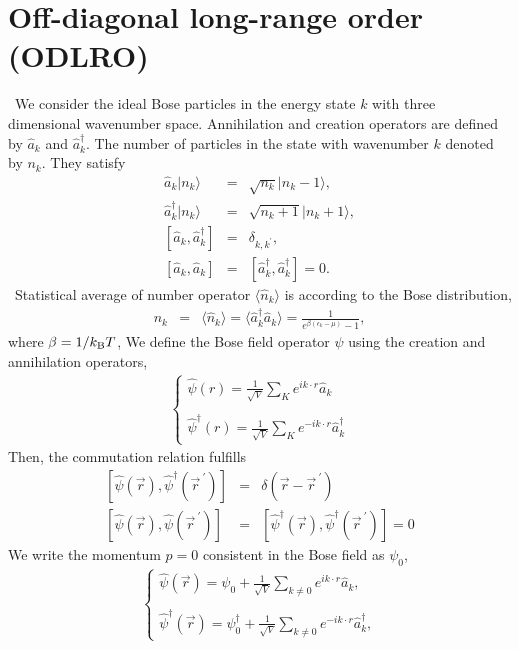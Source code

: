 \documentclass[12pt,a4paper]{report}
\newcommand{\kb} {k_{\rm B}}				            %
\begin{document}
\section{Off-diagonal long-range order (ODLRO)}
\ We consider the ideal Bose particles in the energy state $k$ with three dimensional wavenumber space.
Annihilation and creation operators are defined by $\hat{a}_{k}$ and $\hat{a}^\dagger_{k}$.
The number of particles in the state with wavenumber $k$ denoted by $n_k$. They satisfy
\begin{eqnarray}
\hat{a}_k | n_k \rangle & = & \sqrt{n_k}|n_k - 1 \rangle,
\\
\hat{a}^\dagger_k | n_k \rangle & = & \sqrt{n_k+1} | n_k + 1 \rangle,
\\
\left[ \hat{a}_k, \hat{a}^\dagger_k \right] & = & \delta_{k,k^\prime},
\\
\left[ \hat{a}_k, \hat{a}_k \right] & = & \left[ \hat{a}^\dagger_k, \hat{a}^\dagger_k \right] = 0.
\end{eqnarray}
\ Statistical average of number operator $\langle \hat{n}_k \rangle$ 
is according to the Bose distribution,
\begin{eqnarray}
n_k & = & \langle \hat{n}_k \rangle = \langle \hat{a}^\dagger_k \hat{a}_k \rangle = \frac{1}{e^{\beta(\epsilon_k - \mu)} - 1},
\end{eqnarray}
where $\beta = 1/\kb T$,
We define the Bose field operator $\psi$ using the creation and annihilation operators,
\begin{eqnarray}
\left \{
\begin{array}{l}
\hat{\psi} (r) = \frac{1}{\sqrt{V}} \sum_K e^{i k \cdot r} \hat{a}_k
\\
\\
\hat{\psi}^\dagger (r) = \frac{1}{\sqrt{V}} \sum_K e^{-i k \cdot r} \hat{a}^\dagger_k
\end{array}
\right.
\end{eqnarray}
Then, the commutation relation fulfills
\begin{eqnarray}
\left[ \hat{\psi}(\vec{r}), \hat{\psi}^\dagger(\vec{r}^{\ \prime} ) \right] & = & \delta( \vec{r} - \vec{r}^{\ \prime} )
\\
\left[ \hat{\psi}(\vec{r}), \hat{\psi}(\vec{r}^{\ \prime} ) \right] & = & 
\left[ \hat{\psi}^\dagger(\vec{r}), \hat{\psi}^\dagger(\vec{r}^{\ \prime} ) \right] = 0
\end{eqnarray}
We write the momentum $p=0$ consistent in the Bose field as $\psi_0$,
\begin{eqnarray}
\left \{
\begin{array}{l}
\hat{\psi}(\vec{r}) = \psi_0 + \frac{1}{\sqrt{V}} \sum_{k \neq 0} e^{i k \cdot r} \hat{a}_k,
\\
\\
\hat{\psi}^\dagger(\vec{r}) = \psi^\dagger_0 + \frac{1}{\sqrt{V}} \sum_{k \neq 0} e^{-i k \cdot r} \hat{a}^\dagger_k,
\end{array}
\right.
\end{eqnarray}
\end{document}
